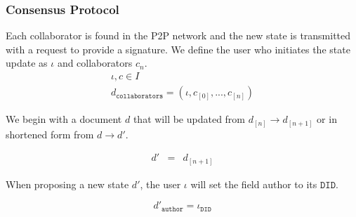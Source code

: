 \subsubsection{Consensus Protocol}
Each collaborator is found in the P2P network and the new state is transmitted with a request to provide a signature. We define the user who initiates the state update as $\iota$ and collaborators $c_n$.
\begin{eqnarray}
\iota,c \in I\\
     d_{\mathtt{collaborators}} = (\iota, c_{[0]}, ..., c_{[n]})
\end{eqnarray}

We begin with a document $d$ that will be updated from $d_{[n]} \to d_{[n+1]}$ or in shortened form from $d \to d'$. 

\begin{eqnarray}
    d' & = & d_{[n+1]}
\end{eqnarray}

When proposing a new state $d'$, the user $\iota$ will set the field author to its $\mathtt{DID}$.

\begin{equation}
    {d'}_{\mathtt{author}} = \iota_{\mathtt{DID}}
\end{equation}

